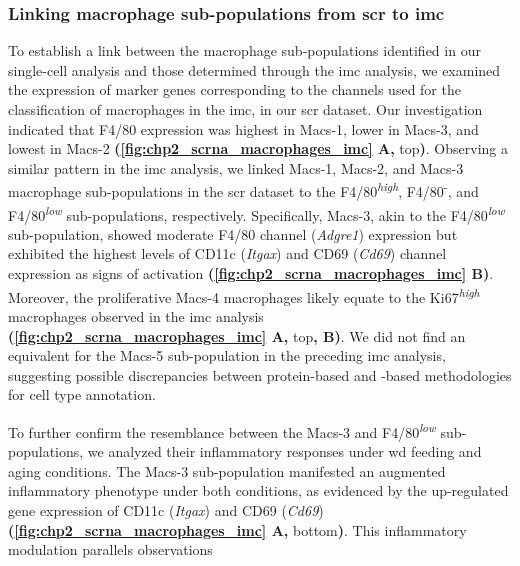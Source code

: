 


\subsubsection{\large Linking macrophage sub-populations from \gls{scr} to \gls{imc}}

To establish a link between the macrophage sub-populations identified in our single-cell analysis and those determined through the \gls{imc} analysis, we examined the expression of marker genes corresponding to the channels used for the classification of macrophages in the \gls{imc}, in our \gls{scr} dataset. Our investigation indicated that F4/80 expression was highest in Macs-1, lower in Macs-3, and lowest in Macs-2 \textbf{(\autoref{fig:chp2_scrna_macrophages_imc} A,} top\textbf{)}. Observing a similar pattern in the \gls{imc} analysis, we linked Macs-1, Macs-2, and Macs-3 macrophage sub-populations in the \gls{scr} dataset to the F4/80\textsuperscript{\textit{high}}, F4/80\textsuperscript{-}, and F4/80\textsuperscript{\textit{low}} sub-populations, respectively. Specifically, Macs-3, akin to the F4/80\textsuperscript{\textit{low}} sub-population, showed moderate F4/80 channel (\textit{Adgre1}) expression but exhibited the highest levels of CD11c (\textit{Itgax}) and CD69 (\textit{Cd69}) channel expression as signs of activation \textbf{(\autoref{fig:chp2_scrna_macrophages_imc} B)}. Moreover, the proliferative Macs-4 macrophages likely equate to the Ki67\textsuperscript{\textit{high}} macrophages observed in the \gls{imc} analysis \textbf{(\autoref{fig:chp2_scrna_macrophages_imc} A,} top\textbf{, B)}. We did not find an equivalent for the Macs-5 sub-population in the preceding \gls{imc} analysis, suggesting possible discrepancies between protein-based and -based methodologies for cell type annotation.\\

\par To further confirm the resemblance between the Macs-3 and F4/80\textsuperscript{\textit{low}} sub-populations, we analyzed their inflammatory responses under \gls{wd} feeding and aging conditions. The Macs-3 sub-population manifested an augmented inflammatory phenotype under both conditions, as evidenced by the up-regulated gene expression of CD11c (\textit{Itgax}) and CD69 (\textit{Cd69}) \textbf{(\autoref{fig:chp2_scrna_macrophages_imc} A,} bottom\textbf{)}. This inflammatory modulation parallels observations 


